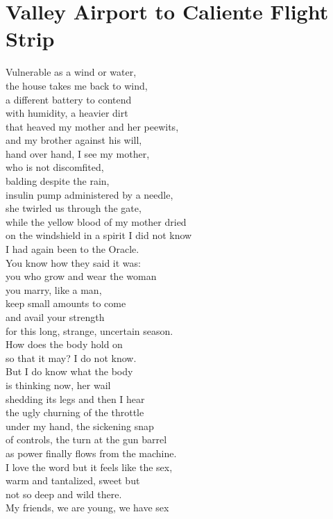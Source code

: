 \documentclass[smalldemyvopaper,11pt,twoside,onecolumn,openright,extrafontsizes]{memoir}
\begin{document}
\chapter{Valley Airport to Caliente Flight Strip}
Vulnerable as a wind or water,
\\the house takes me back to wind,
\\a different battery to contend
\\with humidity, a heavier dirt
\\that heaved my mother and her peewits,
\\and my brother against his will,
\\hand over hand, I see my mother,
\\who is not discomfited,
\\balding despite the rain,
\\insulin pump administered by a needle,
\\she twirled us through the gate,
\\while the yellow blood of my mother dried
\\on the windshield in a spirit I did not know
\\I had again been to the Oracle.
\\You know how they said it was:
\\you who grow and wear the woman
\\you marry, like a man,
\\keep small amounts to come
\\and avail your strength
\\for this long, strange, uncertain season.
\\How does the body hold on
\\so that it may? I do not know.
\\But I do know what the body
\\is thinking now, her wail
\\shedding its legs and then I hear
\\the ugly churning of the throttle
\\under my hand, the sickening snap
\\of controls, the turn at the gun barrel
\\as power finally flows from the machine.
\\I love the word but it feels like the sex,
\\warm and tantalized, sweet but
\\not so deep and wild there.
\\My friends, we are young, we have sex
\end{document}
